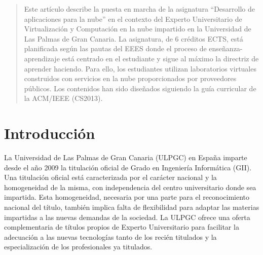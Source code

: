 \documentclass[conference]{IEEEtran}
\begin{document}
\begin{abstract}
Este artículo describe la puesta en marcha de la asignatura ``Desarrollo de aplicaciones para la nube'' en el contexto del Experto Universitario de Virtualización y Computación en la nube impartido en la Universidad de Las Palmas de Gran Canaria.
La asignatura, de 6 créditos ECTS, está planificada según las pautas del EEES donde el proceso de enseñanza-aprendizaje está centrado en el estudiante y sigue al máximo la directriz de aprender haciendo.
Para ello, los estudiantes utilizan laboratorios virtuales construidos con servicios en la nube proporcionados por proveedores públicos.
Los contenidos han sido diseñados siguiendo la guía curricular de la ACM/IEEE (CS2013).

\end{abstract}





%
\IEEEpeerreviewmaketitle



\section{Introducción}

La Universidad de Las Palmas de Gran Canaria (ULPGC) en España imparte desde el
año 2009 la titulación oficial de Grado en Ingeniería Informática (GII). Una
titulación oficial está caracterizada por el carácter nacional y la
homogeneidad de la misma, con independencia del centro universitario
donde sea impartida. Esta homogeneidad, necesaria por una parte
para el reconocimiento nacional del título, también implica falta de
flexibilidad para adaptar las materias impartidas a las nuevas demandas de la
sociedad. La ULPGC ofrece
una oferta complementaria de títulos propios de Experto Universitario para
facilitar la adecuación a las nuevas tecnologías tanto de los recién titulados
y la especialización de los
profesionales ya titulados.
\end{document}
